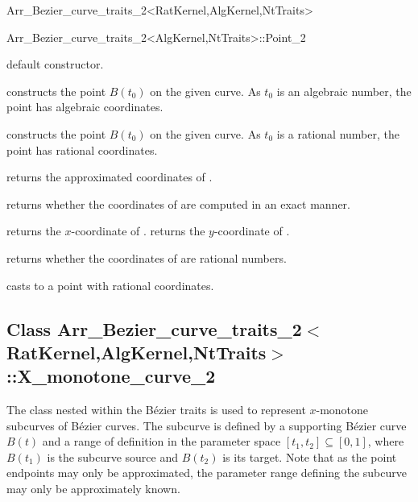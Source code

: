 \begin{ccRefClass}{Arr_Bezier_curve_traits_2<RatKernel,AlgKernel,NtTraits>}
\begin{ccClass}{Arr_Bezier_curve_traits_2<AlgKernel,NtTraits>::Point_2}
\ccCreation
{}

  {default constructor.}

  {constructs the point $B(t_0)$ on the given curve. As $t_0$ is an
   algebraic number, the point has algebraic coordinates.}

  {constructs the point $B(t_0)$ on the given curve. As $t_0$ is a
   rational number, the point has rational coordinates.}

\ccAccessFunctions

  {returns the approximated coordinates of \ccVar.}

  {returns whether the coordinates of \ccVar{} are computed in an exact manner.}

  {returns the $x$-coordinate of \ccVar.
   }
\ccGlue
{}
  {returns the $y$-coordinate of \ccVar.
   }

  {returns whether the coordinates of \ccVar{} are rational numbers.}

  {casts \ccVar{} to a point with rational coordinates.
   }

\end{ccClass}


\subsection*{Class 
Arr\_Bezier\_curve\_traits\_2$<$RatKernel,AlgKernel,NtTraits$>$::X\_monotone\_curve\_2}

The  class nested within the B\'ezier traits is
used to represent $x$-monotone subcurves of B\'ezier curves. The subcurve is
defined by a supporting B\'ezier curve $B(t)$ and a range of definition in
the parameter space $[t_1, t_2] \subseteq [0, 1]$, where $B(t_1)$ is the
subcurve source and $B(t_2)$ is its target. Note that as the point endpoints
may only be approximated, the parameter range defining the subcurve may
only be approximately known.


\end{ccRefClass}
